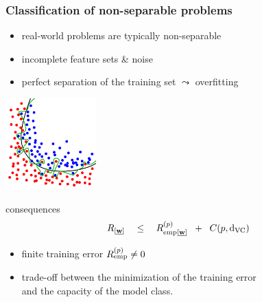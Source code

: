 \begin{frame}\frametitle{Classification of non-separable problems}
	\begin{minipage}{12cm}
		\begin{minipage}{6cm}
			\begin{itemize}
				\item  real-world problems are typically non-separable
				\vspace{1mm}
				\item incomplete feature sets \& noise
				\vspace{1mm}
				\item perfect separation of the training set $\leadsto$ overfitting
			\end{itemize}
		\end{minipage}
		\hfill
		\begin{minipage}{4.5cm}
			\includegraphics[height=3.5cm]{img/overfitting-classification.png}
		\end{minipage}
	\end{minipage}
	
	\pause

	\begin{block}{consequences}
		$$
			R_{[\underline{\mathbf{w}}]} \quad\leq\quad 
			R_{\operatorname{emp} [\underline{\mathbf{w}}]}^{(p)} \;\;+\;\; C(p,\mathrm{d}_{\mathrm{VC}})
		$$
		\vspace{-3mm}
		\begin{itemize}
			\item finite training error $R_{\operatorname{emp}}^{(p)} \neq 0$ 
			\item trade-off between the minimization of the training error \\
		  		and the capacity of the model class.\\
		  		
		\end{itemize}
	\end{block}
\end{frame}

